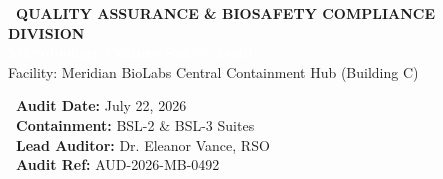 \documentclass[10pt,a4paper]{scrartcl}
\begin{document}
\begin{tcolorbox}[headercard]
\begin{minipage}[c]{0.65\textwidth}
    \textcolor{TealAccent}{\scriptsize\bfseries\faBiohazard\ QUALITY ASSURANCE \& BIOSAFETY COMPLIANCE DIVISION}\\[2pt]
    {\Large\bfseries\textcolor{white}{Microbiology Culture Safety Audit}}\\[2pt]
    \textcolor{SlateMedium}{\small Facility: Meridian BioLabs Central Containment Hub (Building C)}
\end{minipage}%
\begin{minipage}[c]{0.35\textwidth}
    \raggedleft
    \begin{tcolorbox}[colback=white!10,colframe=white!20,arc=2pt,boxrule=0.5pt,left=5pt,right=5pt,top=3pt,bottom=3pt]
        \color{white}
        \scriptsize
        \textbf{\faCalendar\ Audit Date:} July 22, 2026\\
        \textbf{\faLock\ Containment:} BSL-2 \& BSL-3 Suites\\
        \textbf{\faUser\ Lead Auditor:} Dr. Eleanor Vance, RSO\\
        \textbf{\faFile\ Audit Ref:} AUD-2026-MB-0492
    \end{tcolorbox}
\end{minipage}
\end{tcolorbox}

\vspace{-4pt}
\end{document}

